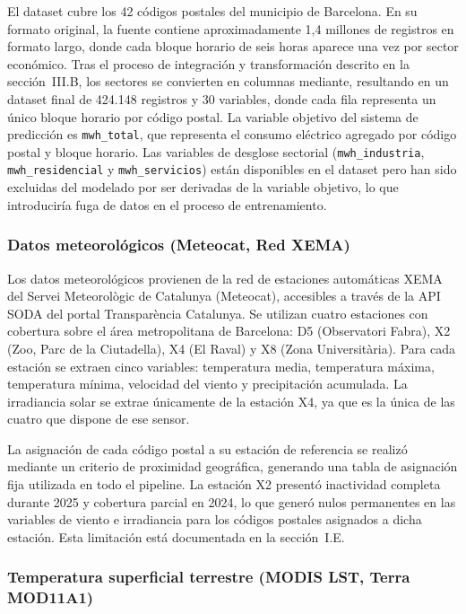 \documentclass[12pt, a4paper]{article}
\begin{document}
El dataset cubre los 42 códigos postales del municipio de Barcelona. En su formato original, la fuente contiene aproximadamente 1,4 millones de registros en formato largo, donde cada bloque horario de seis horas aparece una vez por sector económico. Tras el proceso de integración y transformación descrito en la sección~III.B, los sectores se convierten en columnas mediante, resultando en un dataset final de 424.148 registros y 30 variables, donde cada fila representa un único bloque horario por código postal. La variable objetivo del sistema de predicción es \texttt{mwh\_total}, que representa el consumo eléctrico agregado por código postal y bloque horario. Las variables de desglose sectorial (\texttt{mwh\_industria}, \texttt{mwh\_residencial} y \texttt{mwh\_servicios}) están disponibles en el dataset pero han sido excluidas del modelado por ser derivadas de la variable objetivo, lo que introduciría fuga de datos en el proceso de entrenamiento.

\subsubsection{Datos meteorológicos (Meteocat, Red XEMA)}

Los datos meteorológicos provienen de la red de estaciones automáticas XEMA del Servei Meteorològic de Catalunya (Meteocat), accesibles a través de la API SODA del portal Transparència Catalunya. Se utilizan cuatro estaciones con cobertura sobre el área metropolitana de Barcelona: D5 (Observatori Fabra), X2 (Zoo, Parc de la Ciutadella), X4 (El Raval) y X8 (Zona Universitària). Para cada estación se extraen cinco variables: temperatura media, temperatura máxima, temperatura mínima, velocidad del viento y precipitación acumulada. La irradiancia solar se extrae únicamente de la estación X4, ya que es la única de las cuatro que dispone de ese sensor.

La asignación de cada código postal a su estación de referencia se realizó mediante un criterio de proximidad geográfica, generando una tabla de asignación fija utilizada en todo el pipeline. La estación X2 presentó inactividad completa durante 2025 y cobertura parcial en 2024, lo que generó nulos permanentes en las variables de viento e irradiancia para los códigos postales asignados a dicha estación. Esta limitación está documentada en la sección~I.E.

\subsubsection{Temperatura superficial terrestre (MODIS LST, Terra MOD11A1)}
\end{document}
